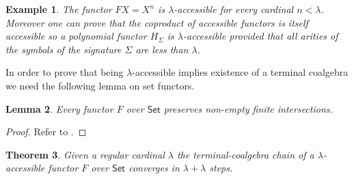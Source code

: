 \documentclass[letterpaper, 11pt, oneside]{memoir}
\theoremstyle{myteo}
\newtheorem{theorem}{Theorem}[section]
\newtheorem{lemma}[theorem]{Lemma}
\newtheorem{example}[theorem]{Example}
\numberwithin{equation}{section}
\newcommand{\Set}{\textsf{Set}}
\begin{document}
\begin{example}
  \label{ex:polynomial-accessible}
  The functor \(FX = X^n\) is \(\lambda\)-accessible for every cardinal \(n < \lambda\).
  Moreover one can prove that the coproduct of accessible functors is itself accessible so a polynomial functor \(H_\Sigma\) is \(\lambda\)-accessible provided that all arities of the symbols of the signature \(\Sigma\) are less than \(\lambda\).
\end{example}

In order to prove that being \(\lambda\)-accessible implies existence of a terminal coalgebra we need the following lemma on set functors.

\begin{lemma}
  \label{lemma:preserve-finite-intersections}
  Every functor \(F\) over \(\Set\) preserves non-empty finite intersections.
\end{lemma}

\begin{proof}
  Refer to \cite[Theorem B.2.2]{coalgebrabook}.
\end{proof}

\begin{theorem}
  \label{teo:accessible-implies-terminal-coalgebra}
  Given a regular cardinal \(\lambda\) the terminal-coalgebra chain of a \(\lambda\)-accessible functor \(F\) over \(\Set\) converges in \(\lambda + \lambda\) steps.
\end{theorem}
\end{document}
